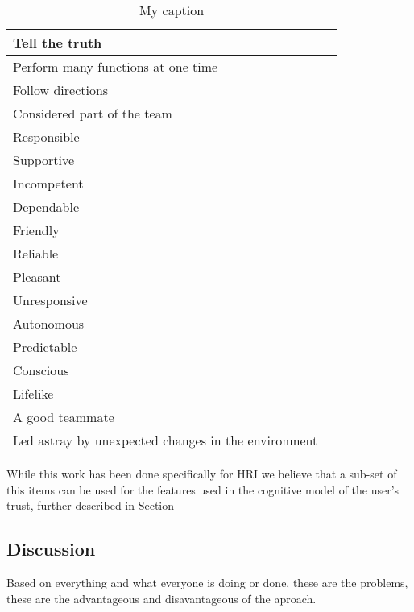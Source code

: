 \begin{table}[]
\begin{tabular}{p{2cm}|l}
		Tell the truth & \\ \hline
		Perform many functions at one time & \\ \hline
		Follow directions & \\ \hline
		Considered part of the team & \\ \hline
		Responsible & \\ \hline
		Supportive & \\ \hline
		Incompetent & \\ \hline
		Dependable & \\ \hline
		Friendly & \\ \hline
		Reliable & \\ \hline
		Pleasant & \\ \hline
		Unresponsive & \\ \hline
		Autonomous & \\ \hline
		Predictable & \\ \hline
		Conscious & \\ \hline
		Lifelike & \\ \hline
		A good teammate & \\ \hline
		Led astray by unexpected changes in the environment & \\
	\end{tabular}
	\caption{My caption}
	\label{my-label}
\end{table}

While this work has been done specifically for \ac{HRI} we believe that a sub-set of this items can be used for the features used in the cognitive model of the user's trust, further described in Section %






\subsection{Discussion}
\label{subsec:RelWorkDiscussion}

Based on everything and what everyone is doing or done, these are the problems, these are the advantageous and disavantageous of the aproach.